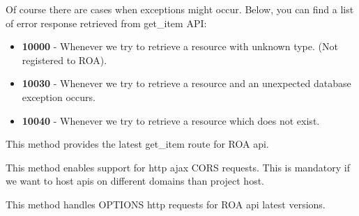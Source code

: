 \documentclass[letterpaper,10pt,english]{sphinxmanual}
\begin{document}
\begin{fulllineitems}
\begin{fulllineitems}
Of course there are cases when exceptions might occur. Below, you can find a list of error response retrieved from
get\_item API:
\begin{itemize}
\item {} 
\textbf{10000} - Whenever we try to retrieve a resource with unknown type. (Not registered to ROA).

\item {} 
\textbf{10030} - Whenever we try to retrieve a resource and an unexpected database exception occurs.

\item {} 
\textbf{10040} - Whenever we try to retrieve a resource which does not exist.

\end{itemize}

\end{fulllineitems}


\begin{fulllineitems}
\label{features/roa/technical_summary:fantastico.contrib.roa_discovery.roa_controller.RoaController.get_item_latest}
This method provides the latest get\_item route for ROA api.

\end{fulllineitems}


\begin{fulllineitems}
\label{features/roa/technical_summary:fantastico.contrib.roa_discovery.roa_controller.RoaController.handle_resource_options}
This method enables support for http ajax CORS requests. This is mandatory if we want to host apis on different
domains than project host.

\end{fulllineitems}


\begin{fulllineitems}
\label{features/roa/technical_summary:fantastico.contrib.roa_discovery.roa_controller.RoaController.handle_resource_options_latest}
This method handles OPTIONS http requests for ROA api latest versions.


\end{fulllineitems}
\end{fulllineitems}
\end{document}
